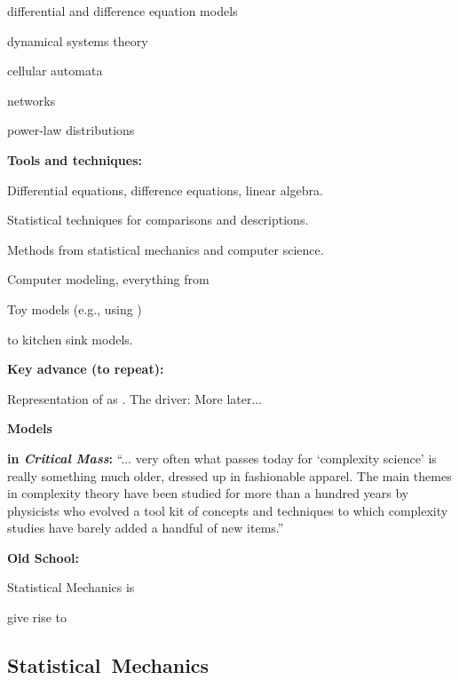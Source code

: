 \begin{frame}[plain]
\begin{frame}[plain]
     
      differential and difference equation models
     
      dynamical systems theory
     
      cellular automata
     
      networks
     
      power-law distributions
    
  


  

  \textbf{Tools and techniques:}
    
     
      Differential equations, difference equations, linear algebra.
     
      Statistical techniques for comparisons and descriptions.
     
      Methods from statistical mechanics and computer science.
     
      Computer modeling, everything from
      
       
        Toy models (e.g., using )
       
        to kitchen sink models.
      
    
  

  \textbf{Key advance (to repeat):}
    
     Representation of  as .
     The driver: 
     More later...
    
  


  \textbf{Models}

  \textbf{ in \textit{Critical Mass}:}\cite{ball2004a}
    ``... very often what passes today for `complexity science'
    is really something much older, dressed up in fashionable apparel.
    The main themes in complexity theory have been studied
    for more than a hundred years by physicists who evolved
    a tool kit of concepts and techniques to which complexity
    studies have barely added a handful of new items.''
  

  \textbf{Old School:}
  
   
    Statistical Mechanics is 
  
     give rise to 
  
  


\subsection{Statistical\ Mechanics}



\end{frame}
\end{frame}
